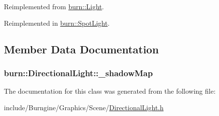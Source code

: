 Reimplemented from \hyperlink{classburn_1_1_light_af14d6771a1b6ff04195467f5c1c6a312}{burn\-::\-Light}.



Reimplemented in \hyperlink{classburn_1_1_spot_light_ab16ad5f4da0fe8fc9cdd07b2931259ee}{burn\-::\-Spot\-Light}.



\subsection{Member Data Documentation}
\hypertarget{classburn_1_1_directional_light_acbeffa715a9e27537c7521e0218330ff}{
\subsubsection[{\-\_\-shadow\-Map}]{ burn\-::\-Directional\-Light\-::\-\_\-shadow\-Map\hspace{0.3cm}{\ttfamily [protected]}}}\label{classburn_1_1_directional_light_acbeffa715a9e27537c7521e0218330ff}


The documentation for this class was generated from the following file\-:\begin{DoxyCompactItemize}
\item 
include/\-Burngine/\-Graphics/\-Scene/\hyperlink{_directional_light_8h}{Directional\-Light.\-h}\end{DoxyCompactItemize}

